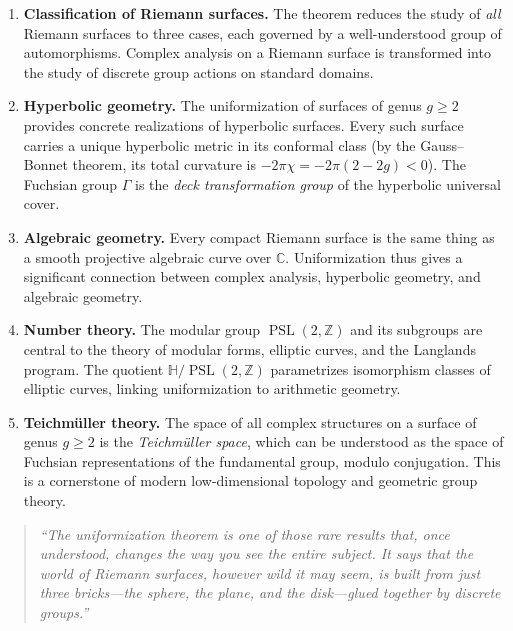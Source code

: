 \begin{enumerate}
    \item \textbf{Classification of Riemann surfaces.} The theorem reduces the study of \emph{all} Riemann surfaces to three cases, each governed by a well-understood group of automorphisms. Complex analysis on a Riemann surface is transformed into the study of discrete group actions on standard domains.

    \item \textbf{Hyperbolic geometry.} The uniformization of surfaces of genus $g \geq 2$ provides concrete realizations of hyperbolic surfaces. Every such surface carries a unique hyperbolic metric in its conformal class (by the Gauss--Bonnet theorem, its total curvature is $-2\pi\chi = -2\pi(2 - 2g) < 0$). The Fuchsian group $\Gamma$ is the \emph{deck transformation group} of the hyperbolic universal cover.

    \item \textbf{Algebraic geometry.} Every compact Riemann surface is the same thing as a smooth projective algebraic curve over $\mathbb{C}$. Uniformization thus gives a significant connection between complex analysis, hyperbolic geometry, and algebraic geometry.

    \item \textbf{Number theory.} The modular group $\operatorname{PSL}(2,\mathbb{Z})$ and its subgroups are central to the theory of modular forms, elliptic curves, and the Langlands program. The quotient $\mathbb{H}/\operatorname{PSL}(2,\mathbb{Z})$ parametrizes isomorphism classes of elliptic curves, linking uniformization to arithmetic geometry.

    \item \textbf{Teichm\"uller theory.} The space of all complex structures on a surface of genus $g \geq 2$ is the \emph{Teichm\"uller space}, which can be understood as the space of Fuchsian representations of the fundamental group, modulo conjugation. This is a cornerstone of modern low-dimensional topology and geometric group theory.
\end{enumerate}

\begin{quote}
\textit{``The uniformization theorem is one of those rare results that, once understood, changes the way you see the entire subject. It says that the world of Riemann surfaces, however wild it may seem, is built from just three bricks---the sphere, the plane, and the disk---glued together by discrete groups.''}
\end{quote}

